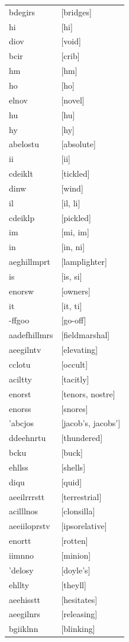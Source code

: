 \documentclass{article}
\begin{document}
\begin{tabular}{ll}
bdegirs & [bridges] \\
hi & [hi] \\
diov & [void] \\
bcir & [crib] \\
hm & [hm] \\
ho & [ho] \\
elnov & [novel] \\
hu & [hu] \\
hy & [hy] \\
abelostu & [absolute] \\
ii & [ii] \\
cdeiklt & [tickled] \\
dinw & [wind] \\
il & [il, li] \\
cdeiklp & [pickled] \\
im & [mi, im] \\
in & [in, ni] \\
aeghillmprt & [lamplighter] \\
is & [is, si] \\
enorsw & [owners] \\
it & [it, ti] \\
-ffgoo & [go-off] \\
aadefhillmrs & [fieldmarshal] \\
aeegilntv & [elevating] \\
cclotu & [occult] \\
aciltty & [tacitly] \\
enorst & [tenors, nostre] \\
enorss & [snores] \\
'abcjos & [jacob's, jacobs'] \\
ddeehnrtu & [thundered] \\
bcku & [buck] \\
ehllss & [shells] \\
diqu & [quid] \\
aeeilrrrstt & [terrestrial] \\
acilllnos & [clonsilla] \\
aeeiiloprstv & [ipsorelative] \\
enortt & [rotten] \\
iimnno & [minion] \\
'delosy & [doyle's] \\
ehllty & [theyll] \\
aeehisstt & [hesitates] \\
aeegilnrs & [releasing] \\
bgiiklnn & [blinking] \\

\end{tabular}
\end{document}

